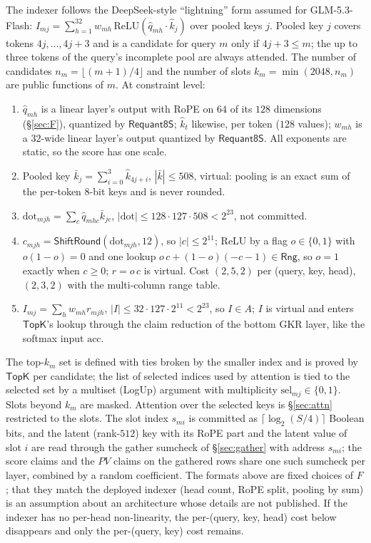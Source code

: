 \documentclass[11pt]{article}
\newcommand{\Rng}{\mathsf{Rng}}
\begin{document}
The indexer follows the DeepSeek-style ``lightning'' form assumed for GLM-5.3-Flash: \(I_{mj} = \sum_{h=1}^{32} w_{mh}\, \mathrm{ReLU}(\hat q_{mh} \cdot \hat k_j)\) over pooled keys \(j\).
Pooled key \(j\) covers tokens \(4j, \ldots, 4j+3\) and is a candidate for query \(m\) only if \(4j + 3 \le m\); the up to three tokens of the query's incomplete pool are always attended.
The number of candidates \(n_m = \lfloor (m+1)/4 \rfloor\) and the number of slots \(k_m = \min(2048, n_m)\) are public functions of \(m\).
At constraint level:
\begin{enumerate}
\item \(\hat q_{mh}\) is a linear layer's output with RoPE on \(64\) of its \(128\) dimensions (\S\ref{sec:F}), quantized by \(\mathsf{Requant8S}\); \(\hat k_t\) likewise, per token (\(128\) values); \(w_{mh}\) is a \(32\)-wide linear layer's output quantized by \(\mathsf{Requant8S}\). All exponents are static, so the score has one scale.
\item Pooled key \(\bar k_j = \sum_{i=0}^{3} \hat k_{4j+i}\), \(|\bar k| \le 508\), virtual: pooling is an exact sum of the per-token \(8\)-bit keys and is never rounded.
\item \(\mathrm{dot}_{mjh} = \sum_c \hat q_{mhc} \bar k_{jc}\), \(|\mathrm{dot}| \le 128\cdot127\cdot508 < 2^{23}\), not committed.
\item \(c_{mjh} = \mathsf{ShiftRound}(\mathrm{dot}_{mjh}, 12)\), so \(|c| \le 2^{11}\); ReLU by a flag \(o \in \{0,1\}\) with \(o(1-o) = 0\) and one lookup \(o\,c + (1-o)(-c-1) \in \Rng\), so \(o = 1\) exactly when \(c \ge 0\); \(r = o\,c\) is virtual. Cost \((2, 5, 2)\) per (query, key, head), \((2,3,2)\) with the multi-column range table.
\item \(I_{mj} = \sum_h w_{mh} r_{mjh}\), \(|I| \le 32\cdot 127\cdot 2^{11} < 2^{23}\), so \(I \in A\); \(I\) is virtual and enters \(\mathsf{TopK}\)'s lookup through the claim reduction of the bottom GKR layer, like the softmax input \(\mathrm{acc}\).
\end{enumerate}
The top-\(k_m\) set is defined with ties broken by the smaller index and is proved by \(\mathsf{TopK}\) per candidate; the list of selected indices used by attention is tied to the selected set by a multiset (LogUp) argument with multiplicity \(\mathrm{sel}_{mj} \in \{0,1\}\).
Slots beyond \(k_m\) are masked.
Attention over the selected keys is \S\ref{sec:attn} restricted to the slots.
The slot index \(s_{mi}\) is committed as \(\lceil\log_2(S/4)\rceil\) Boolean bits, and the latent (rank-\(512\)) key with its RoPE part and the latent value of slot \(i\) are read through the gather sumcheck of \S\ref{sec:gather} with address \(s_{mi}\); the score claims and the \(PV\) claims on the gathered rows share one such sumcheck per layer, combined by a random coefficient.
The formats above are fixed choices of \(F\); that they match the deployed indexer (head count, RoPE split, pooling by sum) is an assumption about an architecture whose details are not published.
If the indexer has no per-head non-linearity, the per-(query, key, head) cost below disappears and only the per-(query, key) cost remains.
\end{document}
